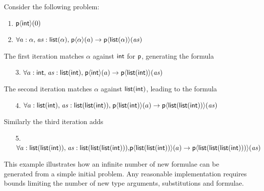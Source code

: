 \documentclass[runningheads]{llncs}
\begin{document}
\begin{examplex}\rm
Consider the following problem:
\begin{enumerate}
   \item \(\textsf{p}\langle \textsf{int}\rangle(0)\)
   \item \(\forall a: \alpha{,}\; \mathit{as}:\textsf{list}(\alpha){,}\; \textsf{p}\langle\alpha\rangle(a) \rightarrow \textsf{p}\langle \textsf{list}(\alpha)\rangle(\mathit{as})\)
\end{enumerate}
%
The first iteration matches \(\alpha\) against \(\textsf{int}\) for $\textsf{p}$, generating the formula
%
\begin{enumerate}
   \item[3.] \(\forall a: \textsf{int}{,}\; \mathit{as}:\textsf{list}(\textsf{int}){,}\; \textsf{p}\langle\textsf{int}\rangle(a) \rightarrow \textsf{p}\langle \textsf{list}(\textsf{int})\rangle(\mathit{as})\)
\end{enumerate}
%
The second iteration matches \(\alpha\) against \(\textsf{list}(\textsf{int})\), leading to the formula
%
\begin{enumerate}
   \item[4.] \(\forall a: \textsf{list}(\textsf{int}){,}\; \mathit{as}:\textsf{list}(\textsf{list}(\textsf{int})){,}\; \textsf{p}\langle\textsf{list}(\textsf{int})\rangle(a) \rightarrow \textsf{p}\langle \textsf{list}(\textsf{list}(\textsf{int}))\rangle(\mathit{as})\)
\end{enumerate}
%
Similarly the third iteration adds
%
\begin{enumerate}
   \item[5.] 
         \( \forall a: \textsf{list}(\textsf{list}(\textsf{int})){,}\; \mathit{as}:\textsf{list}(\textsf{list}(\textsf{list}(\textsf{int}))){,} \\ \textsf{p}\langle\textsf{list}(\textsf{list}(\textsf{int}))\rangle(a) \rightarrow \textsf{p}\langle \textsf{list}(\textsf{list}(\textsf{list}(\textsf{int})))\rangle(\mathit{as})\)
\end{enumerate}

\end{examplex}

This example illustrates how an infinite number of new formulae can be generated from a simple initial problem.
Any reasonable implementation requires bounds limiting the number of new type arguments, substitutions and formulae.
\end{document}
